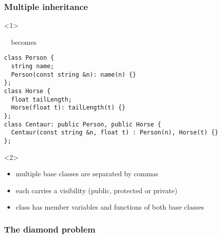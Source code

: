\documentclass{slides}
\begin{document}
\begin{frame}[fragile]
  \frametitle{Multiple inheritance}
  
  \begin{onlyenv}<1>
    ~~becomes
  \end{onlyenv}

\begin{lstlisting}[emph={public}]
class Person {
  string name;
  Person(const string &n): name(n) {}
};
class Horse {
  float tailLength;
  Horse(float t): tailLength(t) {}
};
class Centaur: public Person, public Horse {
  Centaur(const string &n, float t) : Person(n), Horse(t) {}
};
\end{lstlisting}

  \begin{onlyenv}<2>
    \begin{itemize}
    \item multiple base classes are separated by commas
    \item each carries a visibility (public, protected or private)
    \item class has member variables and functions of both base
      classes
    \end{itemize}
  \end{onlyenv}
\end{frame}

\begin{frame}
  \frametitle{The diamond problem}

  \begin{center}
  \end{center}
\end{frame}
\end{document}
